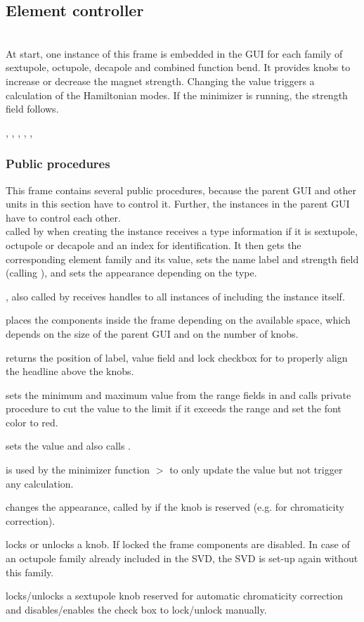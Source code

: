 \documentclass[12pt]{article}
\newcommand\code[1]{{\tt #1}}
\newcommand\guico[1]{{\color{blue}\code{#1}}}
\newcommand\guifco[1]{{\color{violet}\code{#1}}}
\newcommand{\grcod}[2]{\opagui{#1}$>$\guico{#2}}
\newcommand{\opagui}[1]{\colorbox{blue!20}{{\color{black}\code{#1}}}}
\newcommand{\ogui}[1]{\hyperref[#1]{\opagui{#1}}}
\newcommand{\opaguif}[1]{\colorbox{violet!30}{{\color{black}\code{#1}}}}
\newcommand{\oguifh}[2]{\subsection{\label{#2}#1}{\Huge\opaguif{#2}}\\}
\newcommand{\oguif}[1]{\hyperref[#1]{\opaguif{#1}}}
\newcommand{\opauni}[1]{\colorbox{orange!30}{{\color{black}\code{#1}}}}
\newcommand{\ouni}[1]{\hyperref[#1]{\opauni{#1}}}
\newcommand{\uses}[1]{\flushleft {\bf Uses:} #1}
\newcommand{\desc}[1]{#1}
\newcommand{\ppro}[1]{\subsubsection*{Public procedures} #1}
\begin{document}
\oguifh{Element controller}{csexframe} 

\desc{At start, one instance of this frame is embedded in the GUI for each family of sextupole, octupole, decapole and combined function bend. It provides knobs to increase or decrease the magnet strength. Changing the value triggers a calculation of the Hamiltonian modes. If the minimizer is running, the strength field follows.}

\uses{
\ouni{chromreslib}, \ouni{chromelelib}, \ouni{chromlib}, \ogui{ochromsvector},  \ouni{globlib}, \ouni{comauxlib}
}

\ppro{
This frame contains several public procedures, because the parent GUI \ogui{opachroma} and other units in this section have to control it. Further, the instances in the parent GUI have to control each other.\\

\guifco{Init} called by \ogui{opachroma} when creating the instance receives a type information if it is sextupole, octupole or decapole and an index for identification. It then gets the corresponding element family and its value, sets the name label and strength field (calling \guifco{SetVal}), and sets the appearance depending on the type.

\guifco{Brothers}, also called by \ogui{opachroma} receives handles to all instances of \oguif{csexframe} including the instance itself.

\guifco{SetSize} places the components inside the frame depending on the available space, which depends on the size of the parent GUI and on the number of knobs.

\guifco{getTabs} returns the position of label, value field and lock checkbox for \ogui{opachroma} to properly align the headline above the knobs.

\guifco{SetRange} sets the minimum and maximum value from the range fields in \ogui{opachroma} and calls private procedure \guifco{LimitVal} to cut the value to the limit if it exceeds the range and set the font color to red.

\guifco{SetVal} sets the value and also calls \guifco{LimitVal}.

\guifco{UpdateValbyMin} is used by the minimizer function \grcod{opachroma}{PenaltyFunction} to only update the value but not trigger any calculation.

\guifco{mySetColor} changes the appearance, called by \ogui{opachroma} if the knob is reserved (e.g. for chromaticity correction).

\guifco{Lock,UnLock} locks or unlocks a knob. If locked the frame components are disabled. In case of an octupole family already included in the SVD, the SVD is set-up again without this family.

\guifco{Chrom(Lock,Unlock)} locks/unlocks a sextupole knob reserved for automatic chromaticity correction and disables/enables the check box to lock/unlock manually.
}
\end{document}
